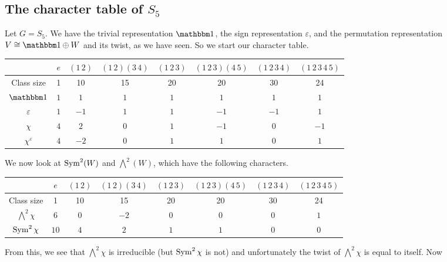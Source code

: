 \subsection{The character table of $S_5$}

\begin{example}
    Let $G = S_5$. We have the trivial representation $\mathbbm 1$, the sign representation $\varepsilon$, and the permutation representation $V \cong \mathbbm 1 \oplus W$ and its twist, as we have seen. So we start our character table.
    \begin{center}
        \small
        \begin{tabular}{cccccccc}
            \toprule
            & $e$ & $(1\,2)$ & $(1\,2)(3\,4)$ & $(1\,2\,3)$ & $(1\,2\,3)(4\,5)$ & $(1\,2\,3\,4)$ & $(1\,2\,3\,4\,5)$ \\
            \midrule
            Class size & 1 & 10 & 15 & 20 & 20 & 30 & 24 \\
            \midrule
            $\mathbbm 1$ & $1$ & $1$ & $1$ & $1$ & $1$ & $1$ & $1$  \\
            $\varepsilon$ & $1$ & $-1$ & $1$ & $1$ & $-1$ & $-1$ & $1$ \\
            $\chi$ & $4$ & $2$ & $0$ & $1$ & $-1$ & $0$ & $-1$ \\
            $\chi^\varepsilon$ & $4$ & $-2$ & $0$ & $1$ & $1$ & $0$ & $1$ \\
            \bottomrule
        \end{tabular}
    \end{center}
    We now look at $\operatorname{Sym}^2(W)$ and ${\bigwedge^2}(W)$, which have the following characters.
    \begin{center}
        \small
        \begin{tabular}{cccccccc}
            \toprule
            & $e$ & $(1\,2)$ & $(1\,2)(3\,4)$ & $(1\,2\,3)$ & $(1\,2\,3)(4\,5)$ & $(1\,2\,3\,4)$ & $(1\,2\,3\,4\,5)$ \\
            \midrule
            Class size & 1 & 10 & 15 & 20 & 20 & 30 & 24 \\
            \midrule
            ${\bigwedge}^2\chi$ & $6$ & $0$ & $-2$ & $0$ & $0$ & $0$ & $1$  \\
            $\operatorname{Sym}^2\chi$ & $10$ & $4$ & $2$ & $1$ & $1$ & $0$ & $0$  \\
            \bottomrule
        \end{tabular}
    \end{center}
    From this, we see that ${\bigwedge}^2\chi$ is irreducible (but $\operatorname{Sym}^2\chi$ is not) and unfortunately the twist of ${\bigwedge}^2\chi$ is equal to itself. Now 

\end{example}
